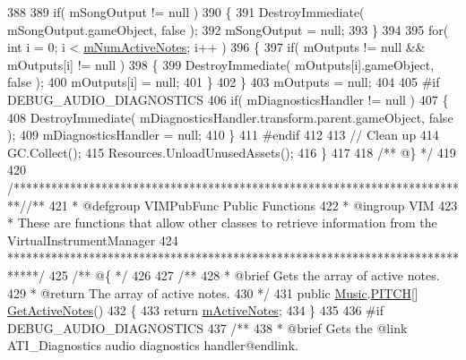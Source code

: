 \begin{DoxyCodeInclude}
388 
389         \textcolor{keywordflow}{if}( mSongOutput != null )
390         \{
391             DestroyImmediate( mSongOutput.gameObject, \textcolor{keyword}{false} );
392             mSongOutput = null;
393         \}
394 
395         \textcolor{keywordflow}{for}( \textcolor{keywordtype}{int} i = 0; i < \hyperlink{group___v_i_m_priv_ga0f7e11945763c48057be326b661dfdaf}{mNumActiveNotes}; i++ )
396         \{
397             \textcolor{keywordflow}{if}( mOutputs != null && mOutputs[i] != null )
398             \{
399                 DestroyImmediate( mOutputs[i].gameObject, \textcolor{keyword}{false} );
400                 mOutputs[i] = null;
401             \}
402         \}
403         mOutputs = null;
404 
405 \textcolor{preprocessor}{        #if DEBUG\_AUDIO\_DIAGNOSTICS}
406             \textcolor{keywordflow}{if}( mDiagnosticsHandler != null )
407             \{
408                 DestroyImmediate( mDiagnosticsHandler.transform.parent.gameObject, \textcolor{keyword}{false} );
409                 mDiagnosticsHandler = null;
410             \}
411 \textcolor{preprocessor}{        #endif}
412 
413         \textcolor{comment}{// Clean up}
414         GC.Collect();
415         Resources.UnloadUnusedAssets();
416     \}
417 \textcolor{comment}{}
418 \textcolor{comment}{    /** @\} */}
419 
420     \textcolor{comment}{/*************************************************************************/}\textcolor{comment}{/** }
421 \textcolor{comment}{    * @defgroup VIMPubFunc Public Functions}
422 \textcolor{comment}{    * @ingroup VIM}
423 \textcolor{comment}{    * These are functions that allow other classes to retrieve information from the
       VirtualInstrumentManager}
424 \textcolor{comment}{    *****************************************************************************/}\textcolor{comment}{}
425 \textcolor{comment}{    /** @\{ */}
426 \textcolor{comment}{}
427 \textcolor{comment}{    /**}
428 \textcolor{comment}{     * @brief Gets the array of active notes.}
429 \textcolor{comment}{     * @return The array of active notes.}
430 \textcolor{comment}{     */}
431     \textcolor{keyword}{public} \hyperlink{class_music}{Music}.\hyperlink{group___music_enums_ga508f69b199ea518f935486c990edac1d}{PITCH}[] \hyperlink{group___v_i_m_pub_func_ga119e0c582106fc9ecc2631e39d71d681}{GetActiveNotes}()
432     \{
433         \textcolor{keywordflow}{return} \hyperlink{group___v_i_m_priv_ga5cedf9995d59b416412677e6004b659c}{mActiveNotes};
434     \}
435 
436 \textcolor{preprocessor}{    #if DEBUG\_AUDIO\_DIAGNOSTICS}
437 \textcolor{comment}{        /** }
438 \textcolor{comment}{        * @brief Gets the @link ATI\_Diagnostics audio diagnostics handler@endlink.}

\end{DoxyCodeInclude}
